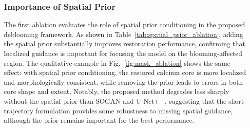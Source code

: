 \documentclass[singleLetter,times]{sagej}
\begin{document}
\subsubsection{Importance of Spatial Prior}

The first ablation evaluates the role of spatial prior conditioning in the proposed deblooming framework. As shown in Table~\ref{tab:spatial_prior_ablation}, adding the spatial prior substantially improves restoration performance, confirming that localized guidance is important for focusing the model on the blooming-affected region. The qualitative example in Fig.~\ref{fig:mask_ablation} shows the same effect: with spatial prior conditioning, the restored calcium core is more localized and morphologically consistent, while removing the prior leads to errors in both core shape and extent. Notably, the proposed method degrades less sharply without the spatial prior than SOGAN and U-Net++, suggesting that the short-trajectory formulation provides some robustness to missing spatial guidance, although the prior remains important for the best performance.

\begin{table}[t]
\centering
\caption{Ablation study evaluating the effect of calcium spatial prior conditioning. Metrics are aggregated over 232 unique 3D test cases from two held-out subjects, with each case representing a distinct plaque, anatomical background, calcium concentration, and exposure/noise combination. Fixed HU thresholds are used: calcium core $>850$ HU and annulus $(550,850]$ HU.}
\label{tab:spatial_prior_ablation}
\end{table}
\end{document}
